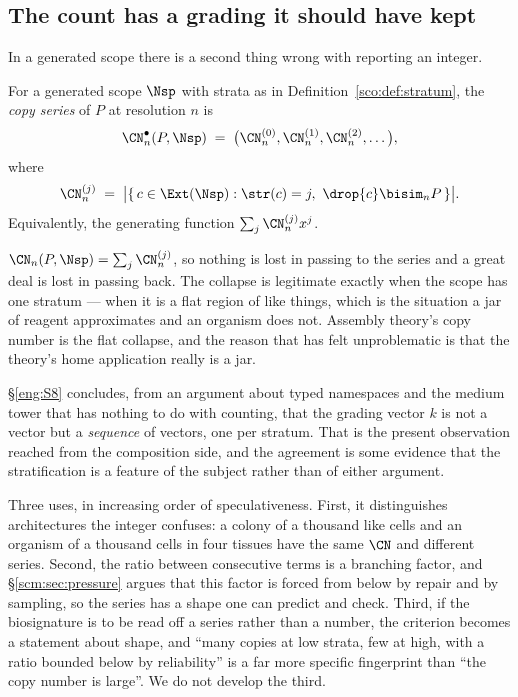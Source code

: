 \subsection{The count has a grading it should have kept}

In a generated scope there is a second thing wrong with reporting an
integer.

\begin{definition}
\label{scm:def:series}
For a generated scope $\Nsp$ with strata as in
Definition~\ref{sco:def:stratum}, the \emph{copy series} of $P$ at
resolution $n$ is
\[
  \CN_n^{\bullet}(P,\Nsp) \;=\;
  \bigl( \CN_n^{(0)}, \CN_n^{(1)}, \CN_n^{(2)}, \dots \bigr),
\]
where
\[
  \CN_n^{(j)} \;=\;
  \bigl|\{\, c \in \Ext(\Nsp) : \str(c) = j,\ \drop{c} \bisim_n P \,\}\bigr| .
\]
Equivalently, the generating function $\sum_j \CN_n^{(j)} x^j$.
\end{definition}

\begin{remark}
\label{scm:rmk:collapse}
$\CN_n(P,\Nsp) = \sum_j \CN_n^{(j)}$, so nothing is lost in passing to the
series and a great deal is lost in passing back. The collapse is
legitimate exactly when the scope has one stratum --- when it is a flat
region of like things, which is the situation a jar of reagent
approximates and an organism does not. Assembly theory's copy number is
the flat collapse, and the reason that has felt unproblematic is that the
theory's home application really is a jar.
\end{remark}

\begin{remark}
\label{scm:rmk:kseq}
\S\ref{eng:S8} concludes, from an argument about typed namespaces and the
medium tower that has nothing to do with counting, that the grading vector
$k$ is not a vector but a \emph{sequence} of vectors, one per stratum.
That is the present observation reached from the composition side, and the
agreement is some evidence that the stratification is a feature of the
subject rather than of either argument.
\end{remark}

\begin{remark}
\label{scm:rmk:seriesfor}
Three uses, in increasing order of speculativeness. First, it distinguishes
architectures the integer confuses: a colony of a thousand like cells and
an organism of a thousand cells in four tissues have the same $\CN$ and
different series. Second, the ratio between consecutive terms is a
branching factor, and \S\ref{scm:sec:pressure} argues that this factor is
forced from below by repair and by sampling, so the series has a shape one
can predict and check. Third, if the biosignature is to be read off a
series rather than a number, the criterion becomes a statement about
shape, and ``many copies at low strata, few at high, with a ratio bounded
below by reliability'' is a far more specific fingerprint than ``the copy
number is large''. We do not develop the third.
\end{remark}

